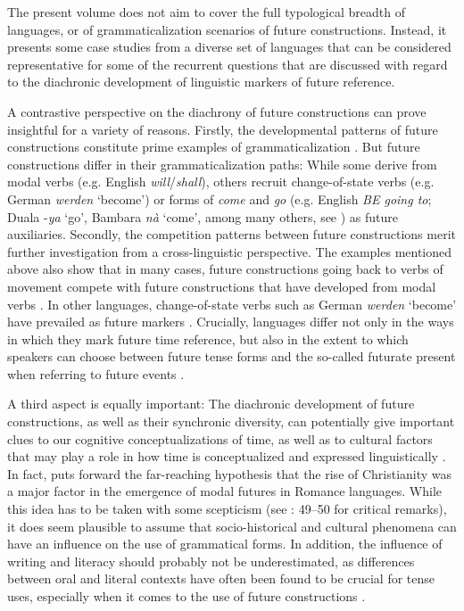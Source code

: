 \documentclass[output=paper,colorlinks,citecolor=brown]{langscibook}
\begin{document}
The present volume does not aim to cover the full typological breadth of languages, or of grammaticalization scenarios of future constructions. Instead, it presents some case studies from a diverse set of languages that can be considered representative for some of the recurrent questions that are discussed with regard to the diachronic development of linguistic markers of future reference. 

A contrastive perspective on the diachrony of future constructions can prove insightful for a variety of reasons. Firstly, the developmental patterns of future constructions constitute prime examples of grammaticalization \citep{HopperTraugott2003}. But future constructions differ in their grammaticalization paths:  \linebreak While some derive from modal verbs (e.g. English \textit{will}/\textit{shall}), others recruit \linebreak change-of-state verbs (e.g. German \textit{werden} `become') or forms of \textit{come} and \textit{go} (e.g. English \textit{BE going to}; Duala -\textit{ya} ‘go’, Bambara \textit{nà} ‘come’, among many others, see \cite{Kuteva2019}) as future auxiliaries. Secondly, the competition patterns between future constructions merit further investigation from a cross-linguistic perspective. The examples mentioned above also show that in many cases, future constructions going back to verbs of movement compete with future constructions that have developed from modal verbs \citep[see e.g.][]{Kuteva2019}. In other languages, change-of-state verbs such as German \textit{werden} ‘become’ have prevailed as future markers \citep[][]{Dahl1985, Dahl2000}. Crucially, languages differ not only in the ways in which they mark future time reference, but also in the extent to which speakers can choose between future tense forms and the so-called futurate present when referring to future events \citep[see e.g.][]{wals-67}.

A third aspect is equally important: The diachronic development of future constructions, as well as their synchronic diversity, can potentially give important clues to our cognitive conceptualizations of time, as well as to cultural factors that may play a role in how time is conceptualized and expressed linguistically \citep{Fleischman1982}. In fact, \citet[]{coseriu1957} puts forward the far-reaching hypothesis that the rise of Christianity was a major factor in the emergence of modal futures in Romance languages. While this idea has to be taken with some scepticism (see \citeauthor{Fleischman1982} \citeyear{Fleischman1982}: 49--50 for critical remarks), it does seem plausible to assume that socio-historical and cultural phenomena can have an influence on the use of grammatical forms. In addition, the influence of writing and literacy should probably not be underestimated, as differences between oral and literal contexts have often been found to be crucial for tense uses, especially when it comes to the use of future constructions \citep[see e.g.][]{fleischman_tense_1990, nau_future_2022}.
\end{document}
